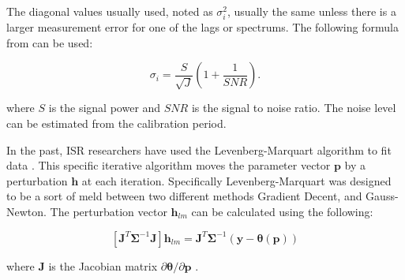 The diagonal values usually used, noted as $\sigma_i^2$, usually the same unless there is a larger measurement error for one of the lags or spectrums.  The following formula from  \cite{nicollsisrschool2013} can be used:

\begin{equation}
\label{sigpow}
\sigma_i = \frac{S}{\sqrt{J}}\left(1+\frac{1}{SNR}\right).
\end{equation}

\noindent where $S$ is the signal power and $SNR$ is the signal to noise ratio. The noise level can be estimated from the calibration period. 

In the past, ISR researchers have used the Levenberg-Marquart algorithm to fit data \cite{nikoukar2008}. This specific iterative algorithm moves the parameter vector $\mathbf{p}$ by a perturbation $\mathbf{h}$ at each iteration\cite{gavin:2013}. Specifically Levenberg-Marquart was designed to be a sort of meld between two different methods Gradient Decent, and Gauss-Newton. The perturbation vector $\mathbf{h}_{lm}$ can be calculated using the following:

\begin{equation}
\left[ \mathbf{J}^T\bm{\Sigma}^{-1}\mathbf{J}\right]\mathbf{h}_{lm} =\mathbf{J}^T\bm{\Sigma}^{-1}(\mathbf{y}-\bm{\theta}(\mathbf{p}))
\label{hlm}
\end{equation}

\noindent where $\mathbf{J}$ is the Jacobian matrix $\partial \bm{\theta}/\partial \mathbf{p}$ \cite{levenberg1944,marquardt:1963}. 

%



